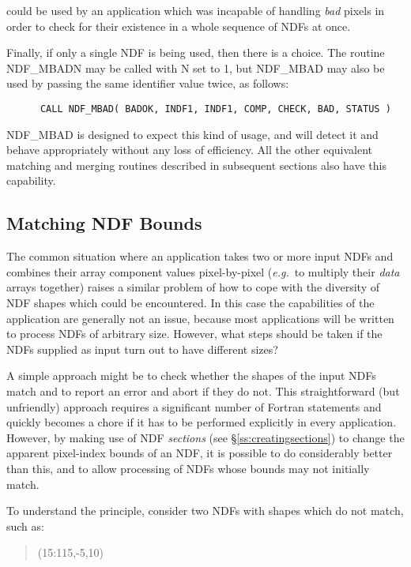 \documentclass[twoside,11pt]{article}
\newcommand{\xlabel}[1]{}
\newcommand{\st}[1]{{\em{#1}}}
\begin{document}
could be used by an application which was incapable of handling \st{bad\/}
pixels in order to check for their existence in a whole sequence of NDFs at
once. 

Finally, if only a single NDF is being used, then there is a choice. 
The routine NDF\_MBADN may be called with N set to 1, but NDF\_MBAD may also
be used by passing the same identifier value twice, as follows: 

\small
\begin{verbatim}
      CALL NDF_MBAD( BADOK, INDF1, INDF1, COMP, CHECK, BAD, STATUS )
\end{verbatim}
\normalsize

NDF\_MBAD is designed to expect this kind of usage, and will detect it and
behave appropriately without any loss of efficiency. 
All the other equivalent matching and merging routines described in
subsequent sections also have this capability. 

\subsection{\xlabel{matching_ndf_bounds}\label{ss:mbnd}Matching NDF Bounds}

The common situation where an application takes two or more input NDFs and
combines their array component values pixel-by-pixel (\st{e.g.}\ to
multiply their \st{data\/} arrays together) raises a similar problem of how
to cope with the diversity of NDF shapes which could be encountered. 
In this case the capabilities of the application are generally not an issue,
because most applications will be written to process NDFs of arbitrary size. 
However, what steps should be taken if the NDFs supplied as input turn out
to have different sizes? 

A simple approach might be to check whether the shapes of the input NDFs
match and to report an error and abort if they do not. 
This straightforward (but unfriendly) approach requires a significant number
of Fortran statements and quickly becomes a chore if it has to be performed
explicitly in every application. 
However, by making use of NDF \st{sections\/} (see
\S\ref{ss:creatingsections}) to change the apparent pixel-index bounds of an
NDF, it is possible to do considerably better than this, and to allow
processing of NDFs whose bounds may not initially match. 

To understand the principle, consider two NDFs with shapes which do not 
match, such as:

\small
\begin{quote}
\begin{center}
(15:115,-5,10)
\end{center}
\end{quote}
\normalsize
\end{document}
